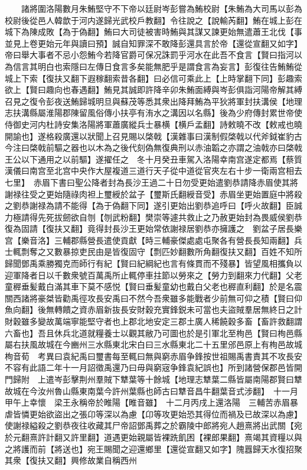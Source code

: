 　　諸將圍洛陽數月朱鮪堅守不下帝以廷尉岑彭嘗為鮪校尉【朱鮪為大司馬以彭為校尉後從邑人韓歆于河内遂歸光武校戶教翻】令往說之【說輸芮翻】鮪在城上彭在城下為陳成敗【為于偽翻】鮪曰大司徒被害時鮪與其謀又諫更始無遣蕭王北伐【事並見上卷更始元年與讀曰預】誠自知罪深不敢降彭還具言於帝【還從宣翻又如字】帝曰舉大事者不忌小怨鮪今若降官爵可保况誅罰乎河水在此吾不食言【賢曰指河以為信言其明白也索隱曰左傳日食言多矣能無肥乎是謂食言為妄言】彭復往告鮪鮪從城上下索【復扶又翻下遐稼翻索昔各翻】曰必信可乘此上【上時掌翻下同】彭趣索欲上【賢曰趣向也春遇翻】鮪見其誠即許降辛卯朱鮪面縛與岑彭俱詣河陽帝解其縛召見之復令彭夜送鮪歸城明旦與蘇茂等悉其衆出降拜鮪為平狄將軍封扶溝侯【地理志扶溝縣屬淮陽郡陳留風俗傳小扶亭有洧水之溝因以名縣】後為少府傳封累世帝使侍御史河内杜詩安集洛陽將軍蕭廣縱兵士暴横【横戶孟翻】詩敕曉不改【敕戒也曉開諭也】遂格殺廣還以狀聞上召見賜以棨戟【漢雜事曰漢制假棨戟以代斧鉞崔豹古今注曰棨戟前驅之器也以木為之後代刻偽無復典刑以赤油韜之亦謂之油戟亦曰棨戟王公以下通用之以前驅】遂擢任之　冬十月癸丑車駕入洛陽幸南宫遂定都焉【蔡質漢儀曰南宫至北宫中央作大屋複道三道行天子從中道從官夾左右十步一衛兩宫相去七里】　赤眉下書曰聖公降者封為長沙王過二十日勿受更始遣劉恭請降赤眉使其將謝禄往受之更始隨祿肉袒上璽綬於盆子【璽斯氏翻綬音受】赤眉坐更始置庭中將殺之劉恭謝禄為請不能得【為于偽翻下同】遂引更始出劉恭追呼曰【呼火故翻】臣誠力極請得先死拔劒欲自刎【刎武粉翻】樊崇等遽共救止之乃赦更始封為畏威侯劉恭復為固請【復扶又翻】竟得封長沙王更始常依謝禄居劉恭亦擁護之　劉盆子居長樂宫【樂音洛】三輔郡縣營長遣使貢獻【時三輔豪傑處處屯聚各有營長長知兩翻】兵士輒剽奪之又數暴掠吏民由是皆復固守【剽匹妙翻數所角翻復扶又翻】百姓不知所歸聞鄧禹乘勝獨克而師行有紀【賢曰紀綱紀也言有條貫而不殘暴】皆望風相攜負以迎軍降者日以千數衆號百萬禹所止輒停車拄節以勞來之【勞力到翻來力代翻】父老童稺垂髪戴白滿其車下莫不感悦【賢曰垂髪童幼也戴白父老也稺直利翻】於是名震關西諸將豪桀皆勸禹徑攻長安禹曰不然今吾衆雖多能戰者少前無可仰之積【賢曰仰魚向翻】後無轉饋之資赤眉新抜長安財穀充實鋒鋭未可當也夫盜賊羣居無終日之計財穀雖多變故萬端寧能堅守者也上郡北地安定三郡土廣人稀饒穀多畜【畜許救翻謂六畜也】吾且休兵北道就糧養士以觀其敝乃可圖也於是引軍北至栒邑【賢曰栒邑縣屬右扶風故城在今豳州三水縣東北宋白曰三水縣東北二十五里邠邑原上有栒邑故城栒音荀　考異曰袁紀禹曰璽書每至輒曰無與窮赤眉争鋒按世祖賜禹書責其不攻長安不容有此語二年十一月詔徵禹還乃曰毋與窮宼争鋒袁紀誤也】所到諸營保郡邑皆開門歸附　上遣岑彭擊荆州羣賊下犨葉等十餘城【地理志犨葉二縣皆屬南陽郡賢曰犨故城在今汝州魯山縣東南葉今許州葉縣也師古曰犨音昌牛翻葉音式涉翻】　十一月甲午上幸懷　梁王永稱帝於睢陽【睢音雖】　十二月丙戌上還洛陽　三輔苦赤眉暴虐皆憐更始欲盜出之張卬等深以為慮【卬等攻更始恐其得位而禍及已故深以為慮】使謝禄縊殺之劉恭夜往收藏其尸帝詔鄧禹葬之於霸陵中郎將宛人趙熹將出武關【宛於元翻熹許計翻又許里翻】道遇更始親屬皆裸跣飢困【裸郎果翻】熹竭其資糧以與之將護而前【將送也】宛王賜聞之迎還鄉里【還從宣翻又如字】隗囂歸天水復招聚其衆【復扶又翻】興修故業自稱西州

